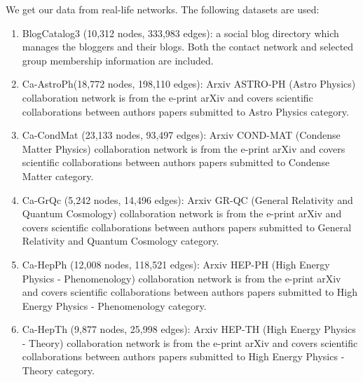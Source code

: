 We get our data from real-life networks\cite{datasets1}\cite{datasets2}. The following datasets are used:
\begin{enumerate}
	\item BlogCatalog3 (10,312 nodes, 333,983 edges): a social blog directory which manages the bloggers and their blogs. Both the contact network and selected group membership information are included.
	\item Ca-AstroPh(18,772 nodes, 198,110 edges): Arxiv ASTRO-PH (Astro Physics) collaboration network is from the e-print arXiv and covers scientific collaborations between authors papers submitted to Astro Physics category.
	\item Ca-CondMat (23,133 nodes, 93,497 edges): Arxiv COND-MAT (Condense Matter Physics) collaboration network is from the e-print arXiv and covers scientific collaborations between authors papers submitted to Condense Matter category.
	\item Ca-GrQc (5,242 nodes, 14,496 edges): Arxiv GR-QC (General Relativity and Quantum Cosmology) collaboration network is from the e-print arXiv and covers scientific collaborations between authors papers submitted to General Relativity and Quantum Cosmology category. 
	\item Ca-HepPh (12,008 nodes, 118,521 edges): Arxiv HEP-PH (High Energy Physics - Phenomenology) collaboration network is from the e-print arXiv and covers scientific collaborations between authors papers submitted to High Energy Physics - Phenomenology category.
	\item Ca-HepTh (9,877 nodes, 25,998 edges): Arxiv HEP-TH (High Energy Physics - Theory) collaboration network is from the e-print arXiv and covers scientific collaborations between authors papers submitted to High Energy Physics - Theory category. 
\end{enumerate}

